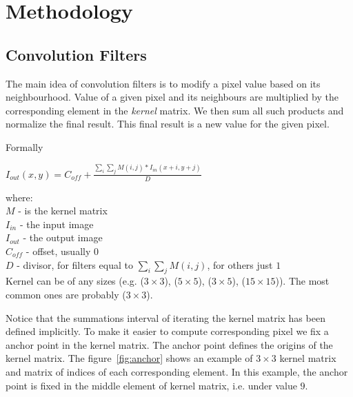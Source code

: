 \documentclass{article}
\begin{document}
\section{Methodology} 
\label{sec:method}

\subsection{Convolution Filters} \label{sec:conv}

The main idea of convolution filters is to modify a pixel value based on its neighbourhood.
Value of a given pixel and its neighbours are multiplied by the corresponding element in the \textit{kernel} matrix. We then sum all such products and normalize the final result. This final result is a new value for the given pixel.

Formally

\begin{center}
$I_{out}(x, y) = C_{off} + \frac{\sum_{i} \sum_{j} M(i,j) * I_{in}(x+i, y+j) }{D}$
\end{center}

where:\\
$M$ - is the kernel matrix \\
$I_{in}$ - the input image\\
$I_{out}$ - the output image\\
$C_{off}$ - offset, usually $0$ \\
$D$ - divisor, for filters equal to $\sum_i \sum_j M(i,j)$, for others just $1$\\

Kernel can be of any sizes (e.g. ($3 \times 3$), ($5 \times 5$), ($3 \times 5$), ($15 \times 15$)). The most common ones are probably ($3 \times 3$).

Notice that the summations interval of iterating the kernel matrix has been defined implicitly. To make it easier to compute corresponding pixel we fix a anchor point in the kernel matrix. The anchor point defines the origins of the kernel matrix. The figure~\ref{fig:anchor} shows an example of $3 \times 3$ kernel matrix and matrix of indices of each corresponding element. In this example, the anchor point is fixed in the middle element of kernel matrix, i.e. under value $9$.
\end{document}
